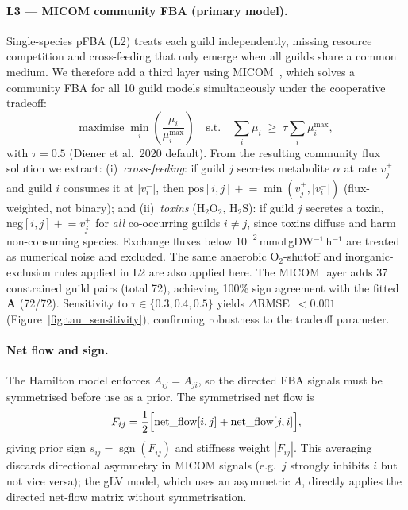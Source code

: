 \documentclass[11pt,a4paper]{article}
\newcommand{\bA}{\mathbf{A}}
\newcommand{\sgn}{\operatorname{sgn}}
\begin{document}
\paragraph{L3 — MICOM community FBA (primary model).}
Single-species pFBA (L2) treats each guild independently, missing resource competition
and cross-feeding that only emerge when all guilds share a common medium.
We therefore add a third layer using MICOM~\citep{diener2020}, which solves a
community FBA for all 10 guild models simultaneously under the cooperative tradeoff:
\begin{equation}
  \text{maximise} \;\min_i\!\left(\frac{\mu_i}{\mu_i^{\max}}\right)
  \quad \text{s.t.} \quad \sum_i \mu_i \;\ge\; \tau \sum_i \mu_i^{\max},
  \label{eq:micom}
\end{equation}
with $\tau=0.5$ (Diener et al.\ 2020 default).
From the resulting community flux solution we extract:
(i)~\emph{cross-feeding}: if guild $j$ secretes metabolite $\alpha$ at rate $v_j^+$ and
guild $i$ consumes it at $|v_i^-|$, then $\text{pos}[i,j] \mathrel{+}=
\min(v_j^+, |v_i^-|)$ (flux-weighted, not binary); and
(ii)~\emph{toxins} (H$_2$O$_2$, H$_2$S): if guild $j$ secretes a toxin,
$\text{neg}[i,j] \mathrel{+}= v_j^+$ for \emph{all} co-occurring guilds $i \ne j$,
since toxins diffuse and harm non-consuming species.
Exchange fluxes below $10^{-2}$\,mmol\,gDW$^{-1}$\,h$^{-1}$ are treated as
numerical noise and excluded.
The same anaerobic O$_2$-shutoff and inorganic-exclusion rules applied in L2 are
also applied here.
The MICOM layer adds 37 constrained guild pairs (total 72), achieving 100\% sign agreement
with the fitted $\bA$ (72/72).
Sensitivity to $\tau \in \{0.3, 0.4, 0.5\}$ yields $\Delta$RMSE~$<0.001$
(Figure~\ref{fig:tau_sensitivity}), confirming robustness to the tradeoff parameter.

\paragraph{Net flow and sign.}
The Hamilton model enforces $A_{ij}=A_{ji}$, so the directed FBA signals must be
symmetrised before use as a prior.
The symmetrised net flow is
\begin{equation}
  F_{ij} = \frac{1}{2}
    \Bigl[\text{net\_flow}[i,j] + \text{net\_flow}[j,i]\Bigr],
  \label{eq:flow}
\end{equation}
giving prior sign $s_{ij}=\sgn(F_{ij})$ and stiffness weight $|F_{ij}|$.
This averaging discards directional asymmetry in MICOM signals (e.g.\ $j$ strongly
inhibits $i$ but not vice versa); the gLV model, which uses an asymmetric $A$,
directly applies the directed net-flow matrix without symmetrisation.
\end{document}

